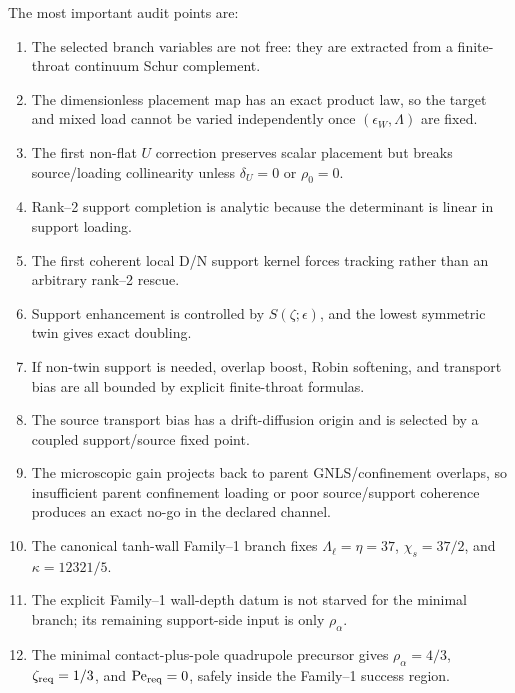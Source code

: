 The most important audit points are:
\begin{enumerate}[leftmargin=2.2em]
  \item The selected branch variables are not free: they are extracted from a finite-throat continuum Schur complement.
  \item The dimensionless placement map has an exact product law, so the target and mixed load cannot be varied independently once \((\epsilon_W,\Lambda)\) are fixed.
  \item The first non-flat \(U\) correction preserves scalar placement but breaks source/loading collinearity unless \(\delta_U=0\) or \(\rho_0=0\).
  \item Rank--2 support completion is analytic because the determinant is linear in support loading.
  \item The first coherent local D/N support kernel forces tracking rather than an arbitrary rank--2 rescue.
  \item Support enhancement is controlled by \(S(\zeta;\epsilon)\), and the lowest symmetric twin gives exact doubling.
  \item If non-twin support is needed, overlap boost, Robin softening, and transport bias are all bounded by explicit finite-throat formulas.
  \item The source transport bias has a drift-diffusion origin and is selected by a coupled support/source fixed point.
  \item The microscopic gain projects back to parent GNLS/confinement overlaps, so insufficient parent confinement loading or poor source/support coherence produces an exact no-go in the declared channel.
  \item The canonical tanh-wall Family--1 branch fixes \(\Lambda_\ell=\eta=37\), \(\chi_s=37/2\), and \(\kappa=12321/5\).
  \item The explicit Family--1 wall-depth datum is not starved for the minimal branch; its remaining support-side input is only \(\rho_\alpha\).
  \item The minimal contact-plus-pole quadrupole precursor gives \(\rho_\alpha=4/3\), \(\zeta_{\rm req}=1/3\), and \(\mathrm{Pe}_{\rm req}=0\), safely inside the Family--1 success region.
\end{enumerate}

